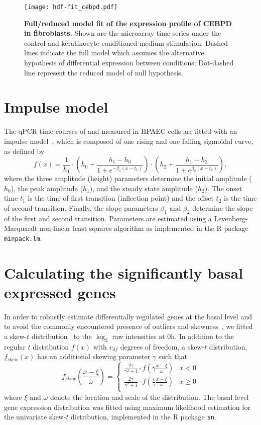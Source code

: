 \begin{figure}[!ht]
\begin{center}
\texttt{[image: hdf-fit\_cebpd.pdf]}
\end{center}
\caption[Full/reduced model fit of gene expression profile]{
{\bf Full/reduced model fit of the expression profile of CEBPD in fibroblasts.}
Shown are the microarray time series under the control and 
keratinocyte-conditioned medium stimulation. Dashed lines indicate the full
model which assumes the alternative hypothesis of differential expression
between conditions; Dot-dashed line represent the reduced model of null 
hypothesis.
}
\label{fig:full_reduced}
\end{figure}

\section{Impulse model}
The qPCR time courses of \tnfa and \sdfonea measured in HPAEC cells are fitted with an impulse model~\cite{Chechik2009}, which is composed of one rising and one falling sigmoidal curve, as defined by
\[
f(x) = \frac{1}{h_1} \cdot \left(h_0+\frac{h_1-h_0}{1+e^{-\beta_1(x-t_1)}}\right) \cdot
\left(h_2+\frac{h_1-h_2}{1+e^{\beta_2(x-t_2)}}\right), 
\]
where the three amplitude (height) parameters determine the initial amplitude 
($h_0$), the peak amplitude
($h_1$), and the steady state amplitude ($h_2$). The onset time $t_1$ is the time of  first transition (inflection point) and the offset $t_2$ is the time of second  transition. Finally, the slope parameters $\beta_1$ and $\beta_2$ determine the slope of the first and second transition. Parameters are estimated using a  Levenberg-Marquardt non-linear least squares  algorithm as implemented in the R package \texttt{minpack.lm}.

\section{Calculating the significantly basal expressed genes}
In order to robustly estimate differentially regulated genes at the basal level and to avoid the commonly encountered 
presence of outliers and skewness~\cite{Marko2011}, we fitted 
a skew-$t$  distribution~\cite{Azzalini2003} to the $\log_2$ raw intensities at 0h. 
In addition to the regular $t$ distribution $f(x)$ with $v_{df}$ degrees of freedom, a skew-$t$ distribution,  $f_{skew}(x)$ has an additional 
skewing parameter $\gamma$ such that  
\[
f_{skew}\left(\frac{x-\xi}{\omega}\right) = 
\begin{cases}
\frac{2\gamma}{\gamma^2+1} \cdot f\left(\gamma\frac{x-\xi}{\omega}\right) & x<0\\
\frac{2\gamma}{\gamma^2+1} \cdot f\left(\frac{1}{\gamma}\frac{x-\xi}{\omega}\right) & x \geqslant 0\\
\end{cases}
\]
where $\xi$  and  $\omega$ denote the location and scale of the distribution.  
The basal level gene expression distribution was fitted using maximum likelihood 
estimation for the 
univariate skew-$t$ distribution, implemented in the R package \texttt{sn}.

%
%
